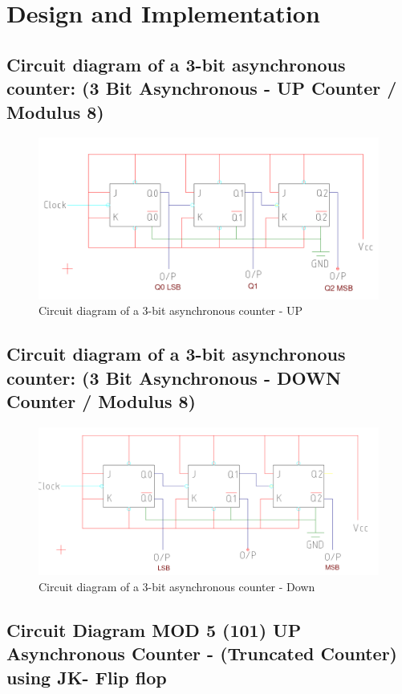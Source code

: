 \documentclass[11pt]{article}
\begin{document}
\section{Design and Implementation}

\subsection{Circuit diagram of a 3-bit asynchronous counter: (3 Bit Asynchronous - UP Counter / Modulus 8)}
\begin{figure}[H]
	\centering
	\includegraphics[scale = 0.5]{asynchronuos counter mod 8 up.png}
	\caption{Circuit diagram of a 3-bit asynchronous counter - UP}
\end{figure}

\subsection{Circuit diagram of a 3-bit asynchronous counter: (3 Bit Asynchronous - DOWN Counter / Modulus 8)}


\begin{figure}[H]
	\centering
	\includegraphics[scale = 0.45]{asynchronuos counter mod 8 down.png}
	\caption{Circuit diagram of a 3-bit asynchronous counter - Down}
\end{figure}
\subsection{Circuit Diagram MOD 5 (101) UP Asynchronous Counter - (Truncated Counter) using JK- Flip flop}
\end{document}
